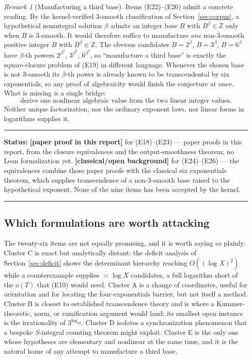 \documentclass[11pt,oneside]{article}
\theoremstyle{definition}
\theoremstyle{remark}
\newtheorem{remark}[theorem]{Remark}
\newcommand{\Z}{\mathbb Z}
\newcommand{\statusnew}{\textcolor{newgreen}{\textbf{[paper proof in this report]}}}
\newcommand{\statusknown}{\textcolor{classicalgray}{\textbf{[classical/open background]}}}
\newenvironment{statusbox}[1]
{\begin{center}\begin{minipage}{0.94\textwidth}\raggedright\hbadness=10000\hrule
\vspace{0.45em}\textbf{Status:} #1\par\vspace{0.35em}}
{\vspace{0.35em}\hrule\end{minipage}\end{center}}
\begin{document}
\begin{remark}[Manufacturing a third base]
\label{eq:rem-third-base}
Items (E22)--(E26) admit a concrete reading.  By the kernel-verified $3$-smooth classification
of Section~\ref{sec:corpus}, a hypothetical nonintegral solution $\beta$ admits an integer base
$B$ with $B^{\beta}\in\Z$ only when $B$ is $3$-smooth.  It would therefore suffice to
manufacture \emph{one} non-$3$-smooth positive integer $B$ with $B^{\beta}\in\Z$.  The obvious
candidates $B=2^{\beta}$, $B=3^{\beta}$, $B=6^{\beta}$ have $\beta$-th powers
$2^{\beta^2}$, $3^{\beta^2}$, $6^{\beta^2}$, so ``manufacture a third base'' is exactly the
square-closure problem of (E19) in different language.  Whenever the chosen base is not
$3$-smooth its $\beta$-th power is already known to be transcendental by six exponentials, so
any proof of algebraicity would finish the conjecture at once.  What is missing is a single
bridge:
\[
 \boxed{\text{derive one nonlinear algebraic value from the two linear integer values}.}
\]
Neither unique factorization, nor the ordinary exponent laws, nor linear forms in logarithms
supplies it.
\end{remark}

\begin{statusbox}{\statusnew{} for (E18)--(E23) --- paper proofs in this report, from the
closure equivalences and the output-smoothness theorem; no Lean formalization yet.
\statusknown{} for (E24)--(E26) --- the equivalences combine those paper proofs with the
classical six exponentials theorem, which supplies transcendence of a non-$3$-smooth base
raised to the hypothetical exponent.  None of the nine items has been accepted by the kernel.}
\end{statusbox}

\subsection{Which formulations are worth attacking}

The twenty-six items are not equally promising, and it is worth saying so plainly.  Cluster C
is exact but analytically distant: the deficit analysis of Section~\ref{sec:deficit} shows the
determinant hierarchy reaching $O((\log X)^2)$ while a counterexample supplies $\asymp\log X$
candidates, a full logarithm short of the $o(T)$ that (E10) would need.  Cluster A is a change
of coordinates, useful for orientation and for locating the four-exponentials barrier, but not
itself a method.  Cluster B is closest to established transcendence theory and is where a
Kummer-theoretic, norm, or ramification argument would land; its smallest open instance is the
irrationality of $3^{\log_23}$.  Cluster D isolates a synchronization phenomenon that a bespoke
$S$-integral counting theorem might exploit.  Cluster E is the only one whose hypotheses are
elementary and nonlinear at the same time, and it is the natural home of any attempt to
manufacture a third base.
\end{document}
